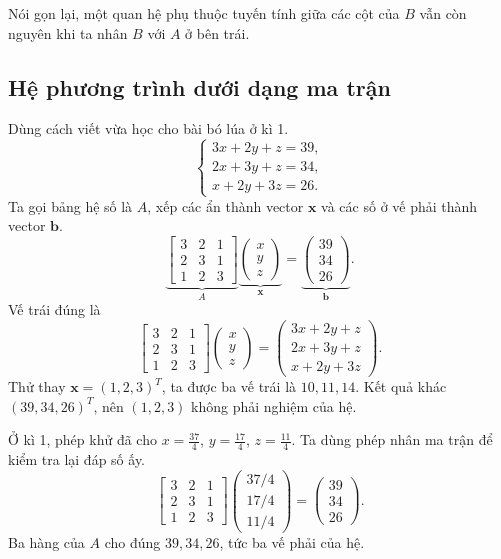 \documentclass[12pt,a4paper]{article}
\begin{document}
Nói gọn lại, một quan hệ phụ thuộc tuyến tính giữa các cột của \(B\) vẫn còn nguyên khi ta nhân \(B\) với \(A\) ở bên trái.

\subsection{Hệ phương trình dưới dạng ma trận}

Dùng cách viết vừa học cho bài bó lúa ở kì 1.
$$
\begin{cases}
3x+2y+z=39,\\
2x+3y+z=34,\\
x+2y+3z=26.
\end{cases}
$$
Ta gọi bảng hệ số là \(A\), xếp các ẩn thành vector \(\mathbf{x}\) và các số ở vế phải thành vector \(\mathbf{b}\).
$$
\underbrace{\left[ \begin{array}{rrr} 3 & 2 & 1\\ 2 & 3 & 1\\ 1 & 2 & 3 \end{array} \right]}_{A}
\underbrace{\left( \begin{array}{c} x\\ y\\ z \end{array} \right)}_{\mathbf{x}}
=
\underbrace{\left( \begin{array}{c} 39\\ 34\\ 26 \end{array} \right)}_{\mathbf{b}}.
$$
Vế trái đúng là
$$
\left[ \begin{array}{rrr} 3 & 2 & 1\\ 2 & 3 & 1\\ 1 & 2 & 3 \end{array} \right]
\left( \begin{array}{c} x\\ y\\ z \end{array} \right)
=
\left( \begin{array}{c}
3x+2y+z\\ 2x+3y+z\\ x+2y+3z
\end{array} \right).
$$
Thử thay \(\mathbf{x}=(1,2,3)^T\), ta được ba vế trái là \(10,11,14\). Kết quả khác \((39,34,26)^T\), nên \((1,2,3)\) không phải nghiệm của hệ.

Ở kì 1, phép khử đã cho \(x=\frac{37}{4}\), \(y=\frac{17}{4}\), \(z=\frac{11}{4}\). Ta dùng phép nhân ma trận để kiểm tra lại đáp số ấy.
$$
\left[ \begin{array}{rrr} 3 & 2 & 1\\ 2 & 3 & 1\\ 1 & 2 & 3 \end{array} \right]
\left( \begin{array}{c} 37/4\\ 17/4\\ 11/4 \end{array} \right)
=
\left( \begin{array}{c} 39\\ 34\\ 26 \end{array} \right).
$$
Ba hàng của \(A\) cho đúng \(39,34,26\), tức ba vế phải của hệ. 
\end{document}
